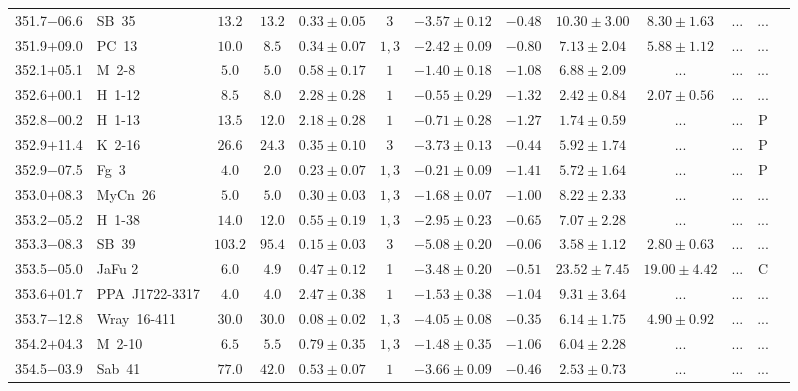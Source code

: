 \documentclass[useAMS]{mn2e}
\begin{document}
\begin{center}
{\begin{longtable}{llccccccccccc}
351.7$-$06.6&SB~35&$      13.2$&$      13.2$&$0.33 \pm 0.05$&$3$&$-3.57 \pm 0.12$&$     -0.48$&$10.30 \pm 3.00$&$8.30 \pm 1.63$&$...$&...\\
351.9$+$09.0&PC~13&$      10.0$&$       8.5$&$0.34 \pm 0.07$&$1,3$&$-2.42 \pm 0.09$&$     -0.80$&$7.13 \pm 2.04$&$5.88 \pm 1.12$&$...$&...\\
352.1$+$05.1&M~2-8&$       5.0$&$       5.0$&$0.58 \pm 0.17$&$1$&$-1.40 \pm 0.18$&$     -1.08$&$6.88 \pm 2.09$&$...$&$...$&...\\
352.6$+$00.1&H~1-12&$       8.5$&$       8.0$&$2.28 \pm 0.28$&$1$&$-0.55 \pm 0.29$&$     -1.32$&$2.42 \pm 0.84$&$2.07 \pm 0.56$&$...$&...\\
352.8$-$00.2&H~1-13&$      13.5$&$      12.0$&$2.18 \pm 0.28$&$1$&$-0.71 \pm 0.28$&$     -1.27$&$1.74 \pm 0.59$&$...$&$...$&P\\
352.9$+$11.4&K~2-16&$      26.6$&$      24.3$&$0.35 \pm 0.10$&$3$&$-3.73 \pm 0.13$&$     -0.44$&$5.92 \pm 1.74$&$...$&$...$&P\\
352.9$-$07.5&Fg~3&$       4.0$&$       2.0$&$0.23 \pm 0.07$&$1,3$&$-0.21 \pm 0.09$&$     -1.41$&$5.72 \pm 1.64$&$...$&$...$&P\\
353.0$+$08.3&MyCn~26&$       5.0$&$       5.0$&$0.30 \pm 0.03$&$1,3$&$-1.68 \pm 0.07$&$     -1.00$&$8.22 \pm 2.33$&$...$&$...$&...\\
353.2$-$05.2&H~1-38&$      14.0$&$      12.0$&$0.55 \pm 0.19$&$1,3$&$-2.95 \pm 0.23$&$     -0.65$&$7.07 \pm 2.28$&$...$&$...$&...\\
353.3$-$08.3&SB~39&$     103.2$&$      95.4$&$0.15 \pm 0.03$&$3$&$-5.08 \pm 0.20$&$     -0.06$&$3.58 \pm 1.12$&$2.80 \pm 0.63$&$...$&...\\
353.5$-$05.0&	JaFu 2	&	$6.0$	&	$4.9$	&	$0.47 \pm 0.12$	&	1	&	$-3.48 \pm 0.20$	&	$-0.51$	&	$23.52 \pm 7.45$	&	$19.00 \pm 4.42$	&	$...$	&	C	\\
353.6$+$01.7&PPA~J1722-3317&$       4.0$&$       4.0$&$2.47 \pm 0.38$&$1$&$-1.53 \pm 0.38$&$     -1.04$&$9.31 \pm 3.64$&$...$&$...$&...\\
353.7$-$12.8&Wray~16-411&$      30.0$&$      30.0$&$0.08 \pm 0.02$&$1,3$&$-4.05 \pm 0.08$&$     -0.35$&$6.14 \pm 1.75$&$4.90 \pm 0.92$&$...$&...\\
354.2$+$04.3&M~2-10&$       6.5$&$       5.5$&$0.79 \pm 0.35$&$1,3$&$-1.48 \pm 0.35$&$     -1.06$&$6.04 \pm 2.28$&$...$&$...$&...\\
354.5$-$03.9&Sab~41&$      77.0$&$      42.0$&$0.53 \pm 0.07$&$1$&$-3.66 \pm 0.09$&$     -0.46$&$2.53 \pm 0.73$&$...$&$...$&...\\

\end{longtable}}
\end{center}
\end{document}
